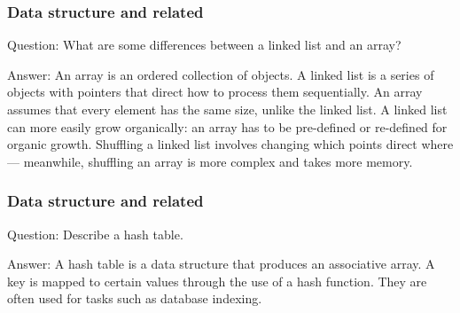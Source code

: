\documentclass[11pt]{beamer}
\begin{document}
\begin{frame}
\frametitle{Data structure and related}
\begin{block}{Question:}
	What are some differences between a linked list and an array?
\end{block}
\begin{block}{Answer:}
	An array is an ordered collection of objects. A linked list is a series of objects with pointers that direct how to process them sequentially. An array assumes that every element has the same size, unlike the linked list. A linked list can more easily grow organically: an array has to be pre-defined or re-defined for organic growth. Shuffling a linked list involves changing which points direct where — meanwhile, shuffling an array is more complex and takes more memory.
\end{block}
\end{frame}

\begin{frame}
\frametitle{Data structure and related}
\begin{block}{Question:}
	Describe a hash table.
\end{block}
\begin{block}{Answer:}
	A hash table is a data structure that produces an associative array. A key is mapped to certain values through the use of a hash function. They are often used for tasks such as database indexing.
\end{block}
\end{frame}
\end{document}
